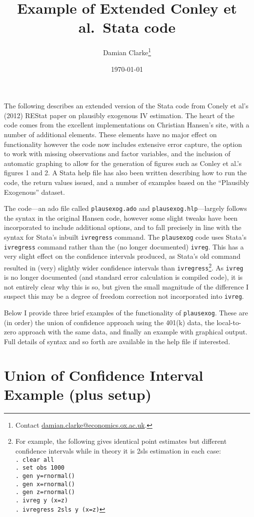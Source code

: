 \documentclass{article}[11pt] %
\title{Example of Extended Conley et al.\ Stata code}
\author{Damian Clarke\thanks{Contact \href{mailto:damian.clarke@economics.ox.ac.uk}
{damian.clarke@economics.ox.ac.uk}.}}
\date{\today}
\begin{document}
\maketitle
\begin{spacing}{1.35}
The following describes an extended version of the Stata code from Conely et al's
(2012) REStat paper on plausibly exogenous IV estimation.  The heart of the code
comes from the excellent implementations on Christian Hansen's site, with a number of 
additional elements. These elements have no major effect on functionality however 
the code now includes extensive error capture, the option to work with missing 
observations and factor variables, and the inclusion of automatic graphing to allow 
for the generation of figures such as Conley et al.'s figures 1 and 2.  A Stata help 
file has also been written describing how to run the code, the return values issued, 
and a number of examples based on the ``Plausibly Exogenous'' dataset.

The code---an ado file called \texttt{plausexog.ado} and \texttt{plausexog.hlp}---largely
follows the syntax in the original Hansen code, however some slight tweaks have been
incorporated to include additional options, and to fall precisely in line with the 
syntax for Stata's inbuilt \texttt{ivregress} command.   The \texttt{plausexog} code
uses Stata's \texttt{ivregress} command rather than the (no longer documented) 
\texttt{ivreg}.  This has a very slight effect on the confidence intervals produced, as
Stata's old command resulted in (very) slightly wider confidence intervals than 
\texttt{ivregress}\footnote{For example, the following gives identical point estimates
but different confidence intervals while in theory it is 2sls estimation in each case:\\
\texttt{. clear all}\\
\texttt{. set obs 1000}\\
\texttt{. gen y=rnormal()}\\
\texttt{. gen x=rnormal()}\\
\texttt{. gen z=rnormal()}\\
\texttt{. ivreg y (x=z)}\\
\texttt{. ivregress 2sls y (x=z)}
}.  As \texttt{ivreg} is no longer documented (and standard error
calculation is compiled code), it is not entirely clear why this is so, but given
the small magnitude of the difference I suspect this may be a degree of freedom 
correction not incorporated into \texttt{ivreg}.

Below I provide three brief examples of the functionality of \texttt{plausexog}.  These
are (in order) the union of confidence approach using the 401(k) data, the local-to-zero
approach with the same data, and finally an example with graphical output.  Full details
of syntax and so forth are available in the help file if interested.

\section{Union of Confidence Interval Example (plus setup)}
\end{spacing}
\end{document}

